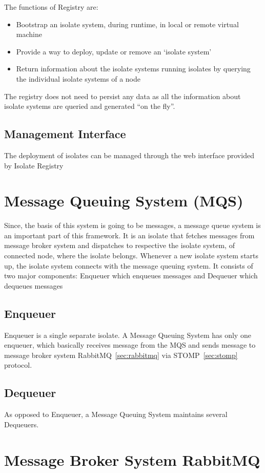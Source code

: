The functions of Registry are:
\begin{itemize}
  \item Bootstrap an isolate system, during runtime, in local or remote virtual machine
  \item Provide a way to deploy, update or remove an ‘isolate system’
  \item Return information about the isolate systems running isolates by querying the individual isolate systems of a node
\end{itemize}
The registry does not need to persist any data as all the information about isolate systems are queried and generated “on the fly”.

  \subsection{Management Interface}
  The deployment of isolates can be managed through the web interface provided by Isolate Registry

\section{Message Queuing System (MQS)}
Since, the basis of this system is going to be messages, a message queue system is an important part of this framework. It is an isolate that fetches messages from message broker system and dispatches to respective the isolate system, of connected node, where the isolate belongs. Whenever a new isolate system starts up, the isolate system connects with the message queuing system.
It consists of two major components: Enqueuer \textendash which enqueues messages and Dequeuer \textendash which dequeues messages
  \subsection{Enqueuer}
  Enqueuer is a single separate isolate. A Message Queuing System has only one enqueuer, which basically receives message from the MQS and sends message to message broker system \textendash RabbitMQ~\ref{sec:rabbitmq} via STOMP~\ref{sec:stomp} protocol.

  \subsection{Dequeuer}
  As opposed to Enqueuer, a Message Queuing System maintains several Dequeuers.

\section{Message Broker System \textendash RabbitMQ}

